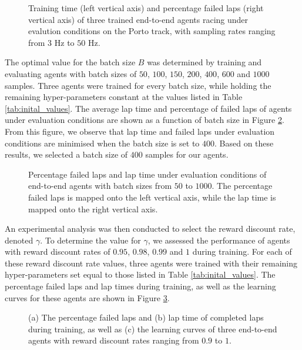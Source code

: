 \begin{figure}[htb!]
    \centering
    
    \caption[Training time and percentage failed laps under evaluation conditions of end-to-end agents with various sampling rates]{Training time (left vertical axis) and percentage failed laps (right vertical axis) of three trained end-to-end agents racing under evalution conditions on the Porto track, with sampling rates ranging from $3$ Hz to $50$ Hz.}
    \label{fig:f_agent}
\end{figure}

The optimal value for the batch size $B$ was determined by training and evaluating agents with batch sizes of $50$, $100$, $150$, $200$, $400$, $600$ and $1000$ samples.
Three agents were trained for every batch size, while holding the remaining hyper-parameters constant at the values listed in Table \ref{tab:inital_values}.
The average lap time and percentage of failed laps of agents under evaluation conditions are shown as a function of batch size in Figure \ref{fig:batch_size}.
From this figure, we observe that lap time and failed laps under evaluation conditions are minimised when the batch size is set to $400$.
Based on these results, we selected a batch size of $400$ samples for our agents.

\begin{figure}[htb!]
    \centering
    
    \caption[Percentage failed laps and lap time under evaluation conditions of end-to-end agents with various batch sizes]{Percentage failed laps and lap time under evaluation conditions of end-to-end agents with batch sizes from $50$ to $1000$. The percentage failed laps is mapped onto the left vertical axis, while the lap time is mapped onto the right vertical axis.}
    \label{fig:batch_size}
\end{figure}


An experimental analysis was then conducted to select the reward discount rate, denoted $\gamma$. 
To determine the value for $\gamma$, we assessed the performance of agents with reward discount rates of $0.95$, $0.98$, $0.99$ and $1$ during training.
For each of these reward discount rate values, three agents were trained with their remaining hyper-parameters set equal to those listed in Table \ref{tab:inital_values}.
The percentage failed laps and lap times during training, as well as the learning curves for these agents are shown in Figure \ref{fig:gamma}.

\begin{figure}[htb!]
    \centering
    
    \caption[Learning curves for tuning reward discount rate]{(a) The percentage failed laps and (b) lap time of completed laps during training, as well as (c) the learning curves of three end-to-end agents with reward discount rates ranging from $0.9$ to $1$.}
    \label{fig:gamma}
\end{figure}


